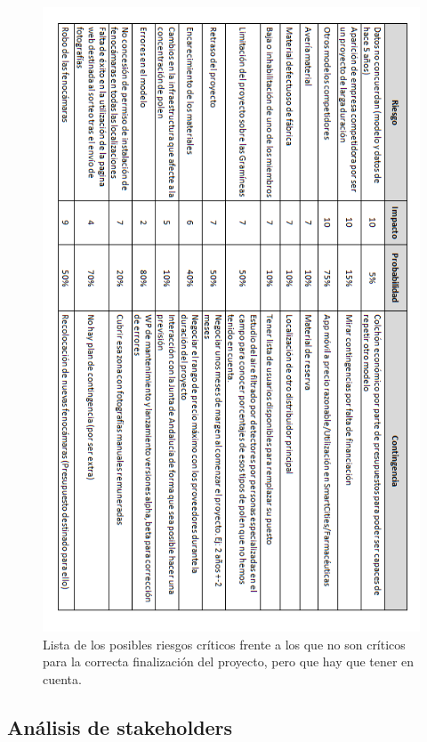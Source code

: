 \documentclass[12pt,oneside,a4paper]{article}
\numberwithin{figure}{section}
\begin{document}
\begin{figure}[H]
\begin{center}
\includegraphics[scale=.8]{RiesgosContingencias.png}
\caption{Lista de los posibles riesgos críticos frente a los que no son críticos para la correcta finalización del proyecto, pero que hay que tener en cuenta.}
\label{fig:Riesgos y Contingencias}
\end{center}
\end{figure}
\clearpage

\subsection{Análisis de stakeholders}
\end{document}
